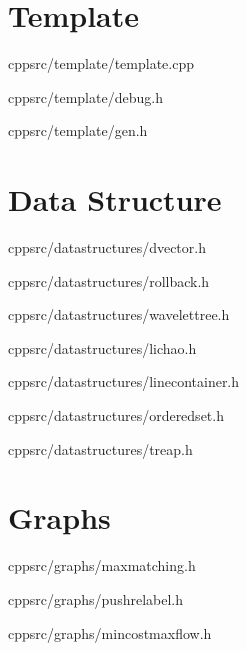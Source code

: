 \documentclass[portrait, 8pt, a4paper, oneside, twocolumn]{extarticle}
\begin{document}
\maketitlepage


\noindent\hrulefill


    \section{Template}

    {}
    {}
    {cpp}{src/template/template.cpp}
    \noindent\hrulefill

    {}
    {}
    {cpp}{src/template/debug.h}
    \noindent\hrulefill

    {}
    {}
    {cpp}{src/template/gen.h}
    \noindent\hrulefill

\section{Data Structure}
    {}
    {}
    {cpp}{src/datastructures/dvector.h}
    \noindent\hrulefill

    {}
    {}
    {cpp}{src/datastructures/rollback.h}
    \noindent\hrulefill

    {}
    {}
    {cpp}{src/datastructures/wavelettree.h}
    \noindent\hrulefill

    {}
    {}
    {cpp}{src/datastructures/lichao.h}
    \noindent\hrulefill

    {}
    {}
    {cpp}{src/datastructures/linecontainer.h}
    \noindent\hrulefill

    {}
    {}
    {cpp}{src/datastructures/orderedset.h}
    \noindent\hrulefill

    {}
    {}
    {cpp}{src/datastructures/treap.h}
    \noindent\hrulefill

\section{Graphs}
    {}
    {}
    {cpp}{src/graphs/maxmatching.h}
    \noindent\hrulefill

    {}
    {}
    {cpp}{src/graphs/pushrelabel.h}
    \noindent\hrulefill

    {}
    {}
    {cpp}{src/graphs/mincostmaxflow.h}
    \noindent\hrulefill
\end{document}
